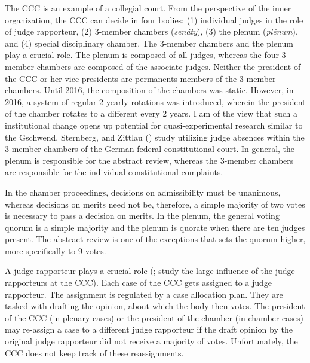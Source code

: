 \documentclass[
  11pt,
]{article}
\begin{document}
The CCC is an example of a collegial court. From the perspective of the inner organization, the CCC can decide in four bodies: (1) individual judges in the role of judge rapporteur, (2) 3-member chambers (\emph{senáty}), (3) the plenum (\emph{plénum}), and (4) special disciplinary chamber. The 3-member chambers and the plenum play a crucial role. The plenum is composed of all judges, whereas the four 3-member chambers are composed of the associate judges. Neither the president of the CCC or her vice-presidents are permanents members of the 3-member chambers. Until 2016, the composition of the chambers was static. However, in 2016, a system of regular 2-yearly rotations was introduced, wherein the president of the chamber rotates to a different every 2 years. I am of the view that such a institutional change opens up potential for quasi-experimental research similar to the Gschwend, Sternberg, and Zittlau () study utilizing judge absences within the 3-member chambers of the German federal constitutional court. In general, the plenum is responsible for the abstract review, whereas the 3-member chambers are responsible for the individual constitutional complaints.

In the chamber proceedings, decisions on admissibility must be unanimous, whereas decisions on merits need not be, therefore, a simple majority of two votes is necessary to pass a decision on merits. In the plenum, the general voting quorum is a simple majority and the plenum is quorate when there are ten judges present. The abstract review is one of the exceptions that sets the quorum higher, more specifically to 9 votes.

A judge rapporteur plays a crucial role (;  study the large influence of the judge rapporteurs at the CCC). Each case of the CCC gets assigned to a judge rapporteur. The assignment is regulated by a case allocation plan. They are tasked with drafting the opinion, about which the body then votes. The president of the CCC (in plenary cases) or the president of the chamber (in chamber cases) may re-assign a case to a different judge rapporteur if the draft opinion by the original judge rapporteur did not receive a majority of votes. Unfortunately, the CCC does not keep track of these reassignments.
\end{document}
